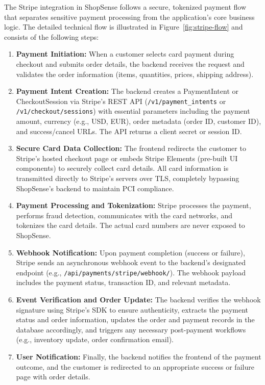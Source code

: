 The Stripe integration in ShopSense follows a secure, tokenized payment flow that separates sensitive payment processing from the application's core business logic. The detailed technical flow is illustrated in Figure~\ref{fig:stripe-flow} and consists of the following steps:

\begin{enumerate}[label=\roman*.]
  \item \textbf{Payment Initiation:} When a customer selects card payment during checkout and submits order details, the backend receives the request and validates the order information (items, quantities, prices, shipping address).
  
  \item \textbf{Payment Intent Creation:} The backend creates a PaymentIntent or CheckoutSession via Stripe's REST API (\texttt{/v1/payment\_intents} or \texttt{/v1/checkout/sessions}) with essential parameters including the payment amount, currency (e.g., USD, EUR), order metadata (order ID, customer ID), and success/cancel URLs. The API returns a client secret or session ID.
  
  \item \textbf{Secure Card Data Collection:} The frontend redirects the customer to Stripe's hosted checkout page or embeds Stripe Elements (pre-built UI components) to securely collect card details. All card information is transmitted directly to Stripe's servers over TLS, completely bypassing ShopSense's backend to maintain PCI compliance.
  
  \item \textbf{Payment Processing and Tokenization:} Stripe processes the payment, performs fraud detection, communicates with the card networks, and tokenizes the card details. The actual card numbers are never exposed to ShopSense.
  
  \item \textbf{Webhook Notification:} Upon payment completion (success or failure), Stripe sends an asynchronous webhook event to the backend's designated endpoint (e.g., \texttt{/api/payments/stripe/webhook/}). The webhook payload includes the payment status, transaction ID, and relevant metadata.
  
  \item \textbf{Event Verification and Order Update:} The backend verifies the webhook signature using Stripe's SDK to ensure authenticity, extracts the payment status and order information, updates the order and payment records in the database accordingly, and triggers any necessary post-payment workflows (e.g., inventory update, order confirmation email).
  
  \item \textbf{User Notification:} Finally, the backend notifies the frontend of the payment outcome, and the customer is redirected to an appropriate success or failure page with order details.
\end{enumerate}

